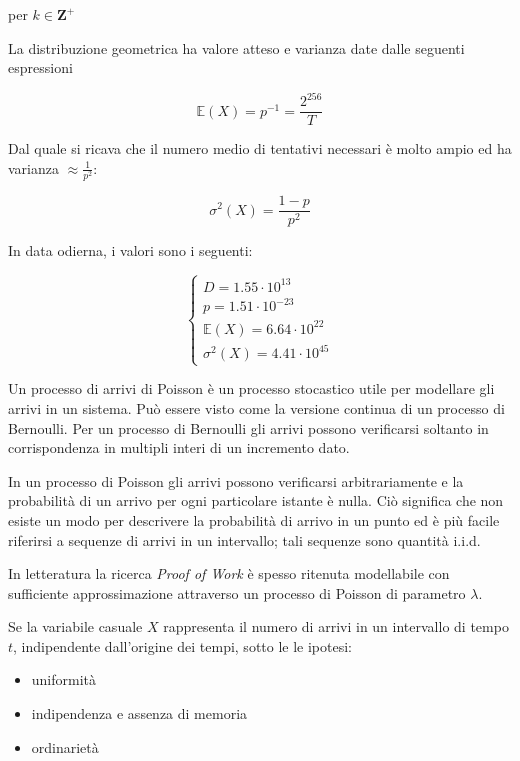 \documentclass{article}
\begin{document}
per $k \in \mathbf{Z}^{+}$

La distribuzione geometrica ha valore atteso e varianza date dalle seguenti espressioni

\begin{equation}
    \mathbb{E}(X) = p^{-1} = \frac{2^{256}}{T} \label{valore atteso}
\end{equation}

Dal quale si ricava che il numero medio di tentativi necessari è molto ampio ed ha varianza $\approx \frac{1}{p^{2}}$:

\begin{equation}
    \sigma^{2}(X) = \frac{1 - p}{p^2} \label{varianza}
\end{equation}

In data odierna, i valori sono i seguenti:

\begin{equation}
    \left \{
        \begin{array}{ll}
            D = 1.55 \cdot 10^{13} \\
            p = 1.51 \cdot 10^{-23} \\
            \mathbb{E}(X) = 6.64 \cdot 10^{22}\\
            \sigma^{2}(X) = 4.41 \cdot 10^{45}
        \end{array}
    \right .
\end{equation}

Un processo di arrivi di Poisson è un processo stocastico utile per modellare gli arrivi in un sistema. Può essere visto come la versione continua di un processo di Bernoulli. Per un processo di Bernoulli gli arrivi possono verificarsi soltanto in corrispondenza in multipli interi di un incremento dato.

In un processo di Poisson gli arrivi possono verificarsi arbitrariamente e la probabilità di un arrivo per ogni particolare istante è nulla. 
Ciò significa che non esiste un modo per descrivere la probabilità di arrivo in un punto ed è più facile riferirsi a sequenze di arrivi in un intervallo; tali sequenze sono quantità i.i.d.

In letteratura la ricerca \textit{Proof of Work} è spesso ritenuta modellabile con sufficiente approssimazione attraverso un processo di Poisson di parametro $\lambda$.

Se la variabile casuale $X$ rappresenta il numero di arrivi in un intervallo di tempo $t$, indipendente dall'origine dei tempi, sotto le le ipotesi:

\begin{itemize}
    \item uniformità
    \item indipendenza e assenza di memoria
    \item ordinarietà
\end{itemize}
\end{document}
